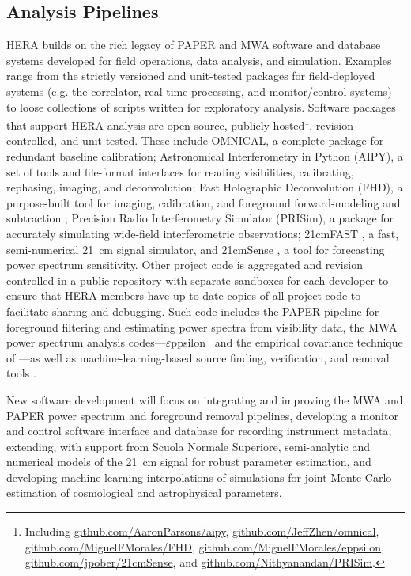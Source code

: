 \documentclass[preprint,11pt]{aastex}
\def\eppsilon{{$\varepsilon$ppsilon}}
\begin{document}
\subsection{Analysis Pipelines} 
\label{sec:software}

\noindent HERA builds on the rich legacy of PAPER and MWA software and database systems 
developed for field operations, data analysis, and simulation.  Examples range from
the strictly versioned and unit-tested packages for field-deployed systems (e.g. the correlator, real-time processing, and
monitor/control systems) to loose collections of scripts written for exploratory analysis.
Software packages that support HERA analysis are open source, publicly 
hosted\footnote{Including \url{github.com/AaronParsons/aipy}, \url{github.com/JeffZhen/omnical}, 
\url{github.com/MiguelFMorales/FHD}, \url{github.com/MiguelFMorales/eppsilon}, \url{github.com/jpober/21cmSense},
and \url{github.com/Nithyanandan/PRISim}.}, revision controlled, and unit-tested.  
These include OMNICAL, a complete package for redundant baseline calibration;
Astronomical Interferometry in Python (AIPY), a set of
tools and file-format interfaces for reading visibilities, calibrating,
rephasing, imaging, and deconvolution; Fast Holographic Deconvolution
(FHD), a purpose-built tool for imaging, calibration, and foreground
forward-modeling and subtraction \citep{sullivan_et_al2012}; Precision Radio Interferometry Simulator 
(PRISim), a package for accurately simulating wide-field interferometric observations;
21cmFAST \citep{mesinger_et_al2011}, a fast, semi-numerical 21~cm signal simulator,
and 21cmSense \citep{pober_et_al2014}, a tool for forecasting power spectrum sensitivity.
Other project code is aggregated and revision
controlled in a public repository with separate sandboxes for each developer to ensure that
HERA members have up-to-date copies of all project code to facilitate sharing and debugging.
Such code includes the PAPER pipeline for foreground filtering and estimating power spectra from
visibility data,
the MWA power spectrum analysis codes---\eppsilon\ \citep{hazelton_et_al2016} and the 
empirical covariance technique of \citet{dillon_et_al2015}---as well as
machine-learning-based source finding, verification, and removal tools \citep{caroll_et_al2016,jacobs_et_al2016,beardsley_et_al2016}. 


New software development will focus on integrating and improving the MWA and PAPER power spectrum and foreground removal pipelines,
developing a monitor and control software interface and database for recording instrument metadata,
extending, with support from Scuola Normale Superiore, semi-analytic and numerical models 
of the 21~cm signal for robust parameter estimation, and developing
machine learning interpolations of simulations for joint Monte Carlo estimation of cosmological and astrophysical parameters.
\end{document}
